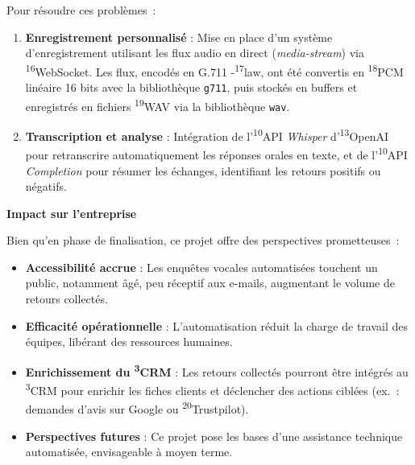 Pour résoudre ces problèmes~:

\begin{enumerate}
    \item \textbf{Enregistrement personnalisé} : Mise en place d’un système d’enregistrement utilisant les flux audio en direct (\textit{media-stream}) via \textsuperscript{16}WebSocket. Les flux, encodés en G.711 \textmu-\textsuperscript{17}law, ont été convertis en \textsuperscript{18}PCM linéaire 16 bits avec la bibliothèque \texttt{g711}, puis stockés en buffers et enregistrés en fichiers \textsuperscript{19}WAV via la bibliothèque \texttt{wav}.\vspace{0.3cm}
    \item \textbf{Transcription et analyse} : Intégration de l’\textsuperscript{10}API \textit{Whisper} d’\textsuperscript{13}OpenAI pour retranscrire automatiquement les réponses orales en texte, et de l’\textsuperscript{10}API \textit{Completion} pour résumer les échanges, identifiant les retours positifs ou négatifs.\vspace{0.3cm}
\end{enumerate}

\textbf{Impact sur l’entreprise}\vspace{0.3cm}

Bien qu’en phase de finalisation, ce projet offre des perspectives prometteuses~:

\begin{itemize}
    \item \textbf{Accessibilité accrue} : Les enquêtes vocales automatisées touchent un public, notamment âgé, peu réceptif aux e-mails, augmentant le volume de retours collectés.\vspace{0.3cm}
    \item \textbf{Efficacité opérationnelle} : L’automatisation réduit la charge de travail des équipes, libérant des ressources humaines.\vspace{0.3cm}
    \item \textbf{Enrichissement du \textsuperscript{3}CRM} : Les retours collectés pourront être intégrés au \textsuperscript{3}CRM pour enrichir les fiches clients et déclencher des actions ciblées (ex.~: demandes d’avis sur Google ou \textsuperscript{20}Trustpilot).\vspace{0.3cm}
    \item \textbf{Perspectives futures} : Ce projet pose les bases d’une assistance technique automatisée, envisageable à moyen terme.\vspace{0.3cm}
\end{itemize}

